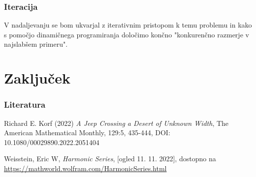\documentclass{beamer}
\begin{document}
 \begin{frame}
    \frametitle{Iteracija}
    V nadaljevanju se bom ukvarjal z iterativnim pristopom k temu problemu in kako s pomočjo dinamičnega programiranja  
    določimo končno "konkurenčno razmerje v najslabšem primeru".
   \end{frame}

\section{Zaključek} 
 \begin{frame}
    \frametitle{Literatura}
    \begin{thebibliography}{9}
        Richard E. Korf (2022) \textit{A Jeep Crossing a Desert of Unknown Width}, The
        American Mathematical Monthly, 129:5, 435-444, DOI: 10.1080/00029890.2022.2051404
                
        Weisstein, Eric W, \textit{Harmonic Series}, [ogled 11. 11. 2022], dostopno na \url{https://mathworld.wolfram.com/HarmonicSeries.html}
        \end{thebibliography}
   \end{frame}
\end{document}
